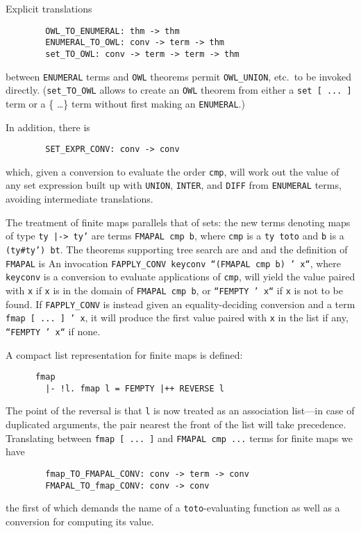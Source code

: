 Explicit translations
\begin{verbatim}
        OWL_TO_ENUMERAL: thm -> thm
        ENUMERAL_TO_OWL: conv -> term -> thm
        set_TO_OWL: conv -> term -> term -> thm
\end{verbatim}
between {\tt ENUMERAL} terms and {\tt OWL} theorems permit {\tt OWL_UNION},
etc.~to be invoked directly. ({\tt set_TO_OWL} allows to create an {\tt OWL}
theorem from either a {\tt set [ ...\ ]} term or a \{ \dots \} term
without first making an {\tt ENUMERAL}.)

In addition, there is
\begin{verbatim}
        SET_EXPR_CONV: conv -> conv
\end{verbatim}
which, given a conversion to evaluate the order {\tt cmp}, will work out
the value of any set expression built up with {\tt UNION}, {\tt INTER},
and {\tt DIFF} from {\tt ENUMERAL} terms, avoiding intermediate
translations.

The treatment of finite maps parallels that of sets: the new terms
denoting maps of type {\tt ty |-> ty'} are terms {\tt FMAPAL cmp b}, where
{\tt cmp} is a {\tt ty toto} and {\tt b} is a {\tt(ty\#ty') bt}. The
theorems supporting tree search are
and
and the definition of {\tt FMAPAL} is
An invocation {\tt FAPPLY_CONV keyconv ``(FMAPAL cmp b) ' x``}, where
{\tt keyconv} is a conversion to evaluate applications of {\tt cmp},
will yield the value paired with {\tt x} if {\tt x} is in the domain of
{\tt FMAPAL cmp b}, or {\tt``FEMPTY ' x``} if {\tt x} is not to be found.
If {\tt FAPPLY_CONV} is instead given an equality-deciding conversion and
a term {\tt fmap [ ...\ ] ' x}, it will produce the first value paired with
{\tt x} in the list if any, {\tt``FEMPTY ' x``} if none.

A compact list representation for finite maps is defined:
\begin{verbatim}
      fmap
        |- !l. fmap l = FEMPTY |++ REVERSE l
\end{verbatim}
The point of the reversal is that {\tt l} is now treated as an
association list---in case of duplicated arguments, the pair nearest the
front of the list will take precedence. Translating between
{\tt fmap [ ...\ ]} and {\tt FMAPAL cmp ...} terms for finite maps we have
\begin{verbatim}
        fmap_TO_FMAPAL_CONV: conv -> term -> conv
        FMAPAL_TO_fmap_CONV: conv -> conv
\end{verbatim}
the first of which demands the name of a {\tt toto}-evaluating function as
well as a conversion for computing its value.

